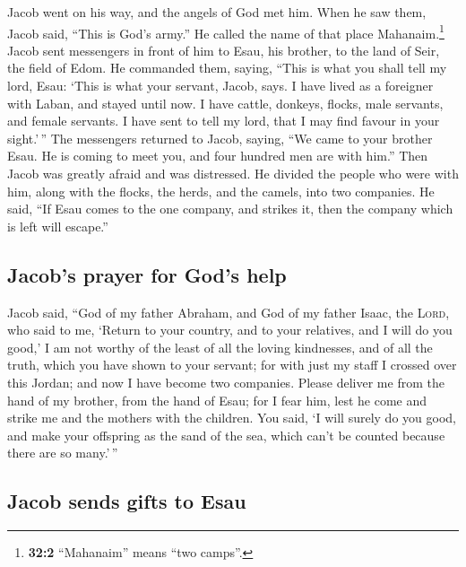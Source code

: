  Jacob went on his way, and the angels of God met him.
 When he saw them, Jacob said, ``This is God's army.'' He
called the name of that place Mahanaim.\footnote{\textbf{32:2}
  ``Mahanaim'' means ``two camps''.}  Jacob sent
messengers in front of him to Esau, his brother, to the land of Seir,
the field of Edom.  He commanded them, saying, ``This is
what you shall tell my lord, Esau: `This is what your servant, Jacob,
says. I have lived as a foreigner with Laban, and stayed until now.
 I have cattle, donkeys, flocks, male servants, and female
servants. I have sent to tell my lord, that I may find favour in your
sight.'\,''  The messengers returned to Jacob, saying,
``We came to your brother Esau. He is coming to meet you, and four
hundred men are with him.''  Then Jacob was greatly afraid
and was distressed. He divided the people who were with him, along with
the flocks, the herds, and the camels, into two companies.
 He said, ``If Esau comes to the one company, and strikes
it, then the company which is left will escape.''

\hypertarget{jacobs-prayer-for-gods-help}{%
\subsection{Jacob's prayer for God's
help}\label{jacobs-prayer-for-gods-help}}

 Jacob said, ``God of my father Abraham, and God of my
father Isaac, the \textsc{Lord}, who said to me, `Return to your
country, and to your relatives, and I will do you good,' 
I am not worthy of the least of all the loving kindnesses, and of all
the truth, which you have shown to your servant; for with just my staff
I crossed over this Jordan; and now I have become two companies.
 Please deliver me from the hand of my brother, from the
hand of Esau; for I fear him, lest he come and strike me and the mothers
with the children.  You said, `I will surely do you good,
and make your offspring as the sand of the sea, which can't be counted
because there are so many.'\,''

\hypertarget{jacob-sends-gifts-to-esau}{%
\subsection{Jacob sends gifts to Esau}\label{jacob-sends-gifts-to-esau}}

